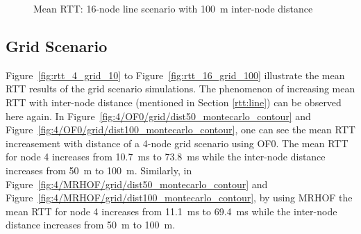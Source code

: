 \begin{figure}[p]
  \centering
    \leavevmode
  \caption{Mean RTT: 16-node line scenario with 100~m inter-node distance}
 \label{fig:rtt_16_line_100}
\end{figure}


\clearpage
\subsection{Grid Scenario}
\label{rtt:grid}

Figure~\ref{fig:rtt_4_grid_10} to Figure~\ref{fig:rtt_16_grid_100} illustrate the mean RTT results of the grid scenario simulations. The phenomenon of increasing mean RTT with inter-node distance (mentioned in Section \ref{rtt:line}) can be observed here again. In Figure~\ref{fig:4/OF0/grid/dist50_montecarlo_contour} and Figure~\ref{fig:4/OF0/grid/dist100_montecarlo_contour}, one can see the mean RTT increasement with distance of a 4-node grid scenario using OF0. The mean RTT for node 4 increases from  10.7~ms to 73.8~ms while the inter-node distance increases from 50~m to 100~m. Similarly, in Figure~\ref{fig:4/MRHOF/grid/dist50_montecarlo_contour} and Figure~\ref{fig:4/MRHOF/grid/dist100_montecarlo_contour}, by using MRHOF the mean RTT for node 4 increases from  11.1~ms to 69.4~ms while the inter-node distance increases from 50~m to 100~m.

